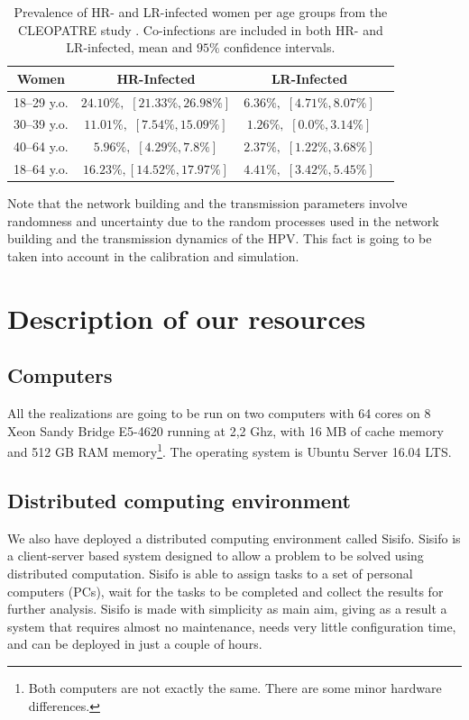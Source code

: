 \begin{table}[H]
	\centering
	\begin{tabular}{cccc}
		\toprule
		\textbf{Women} & \textbf{HR-Infected} & \textbf{LR-Infected} \\
		\midrule
		18--29 y.o. & $24.10\%,$ $[21.33\%, 26.98\%]$ & $6.36\%,$ $[4.71\%, 8.07\%]$ \\
		30--39 y.o. & $11.01\%,$ $[7.54\%, 15.09\%]$ & $1.26\%,$ $[0.0\%, 3.14\%]$ \\
		40--64 y.o. & $5.96\%,$ $[4.29\%, 7.8\%]$ & $2.37\%,$ $[1.22\%, 3.68\%]$ \\
		\midrule
		18--64 y.o. & $16.23\%,$$[14.52\%, 17.97\%]$ & $4.41\%,$ $[3.42\%, 5.45\%]$ \\
		\bottomrule
	\end{tabular}
	\caption{Prevalence of HR- and LR-infected women per age groups from the 	
		CLEOPATRE study \protect\cite{castellsague2012prevalence}. Co-infections are included in both HR- and LR-infected, mean and $95\%$ confidence intervals.}
	\label{datosConstruccion}
\end{table}

Note that the network building and the transmission parameters involve randomness and uncertainty due to the random processes used in the network building and the transmission dynamics of the HPV. This fact is going to be taken into account in the  calibration and simulation.

\section{Description of our resources}

\subsection{Computers}
All the realizations are going to be run on two computers with 64 cores on 8 Xeon Sandy Bridge E5-4620 running at 2,2 Ghz, with 16 MB of cache memory and 512 GB RAM memory\footnote{Both computers are not exactly the same. There are some minor hardware differences.}. The operating system is Ubuntu Server 16.04 LTS. 

\subsection{Distributed computing environment}
We also have deployed a distributed computing environment called Sisifo. Sisifo is a client-server based system designed to allow a problem to be solved using distributed computation. Sisifo is able to assign tasks to a set of personal computers (PCs), wait for the tasks to be completed and collect the results for further analysis. Sisifo is made with simplicity as main aim, giving as a result a system that requires almost no maintenance, needs very little configuration time, and can be deployed in just a couple of hours.

